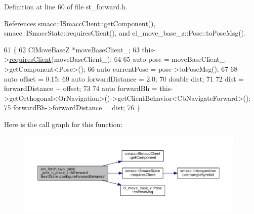 Definition at line 60 of file st\+\_\+forward.\+h.



References smacc\+::\+I\+Smacc\+Client\+::get\+Component(), smacc\+::\+I\+Smacc\+State\+::requires\+Client(), and cl\+\_\+move\+\_\+base\+\_\+z\+::\+Pose\+::to\+Pose\+Msg().


\begin{DoxyCode}
61   \{
62     ClMoveBaseZ *moveBaseClient\_;
63     this->\hyperlink{classsmacc_1_1ISmaccState_a7f95c9f0a6ea2d6f18d1aec0519de4ac}{requiresClient}(moveBaseClient\_);
64 
65     \textcolor{keyword}{auto} pose = moveBaseClient\_->getComponent<Pose>();
66     \textcolor{keyword}{auto} currentPose = pose->toPoseMsg();
67 
68     \textcolor{keyword}{auto} offset = 0.15;
69     \textcolor{keyword}{auto} forwardDistance = 2.0;
70     \textcolor{keywordtype}{double} dist;
71     
72     dist = forwardDistance + offset;
73 
74     \textcolor{keyword}{auto} forwardBh = this->getOrthogonal<OrNavigation>()->getClientBehavior<CbNavigateForward>();
75     forwardBh->forwardDistance = dist;
76   \}
\end{DoxyCode}
Here is the call graph for this function\+:
\nopagebreak
\begin{figure}[H]
\begin{center}
\leavevmode
\includegraphics[width=350pt]{structsm__fetch__two__table__pick__n__place__1_1_1StForwardNextTable_ae2358c473474c13a9cf8c017ec7e7735_cgraph}
\end{center}
\end{figure}
\mbox{\label{structsm__fetch__two__table__pick__n__place__1_1_1StForwardNextTable_a7b7d04ab57af4686b394afda86c891af}} 
